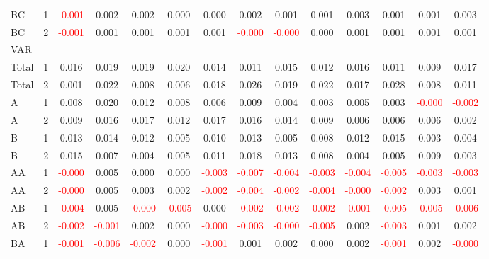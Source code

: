 \begin{table}[!htb]
{\begin{tabular}{llcccccccccccc}
BC & 1 & \textcolor{red}{-0.001} & 0.002 & 0.002 & 0.000 & 0.000 & 0.002 & 0.001 & 0.001 & 0.003 & 0.001 & 0.001 & 0.003\\
BC & 2 & \textcolor{red}{-0.001} & 0.001 & 0.001 & 0.001 & 0.001 & \textcolor{red}{-0.000} & \textcolor{red}{-0.000} & 0.000 & 0.001 & 0.001 & 0.001 & 0.001\\
\hline
VAR &  &  &  &  &  &  &  &  &  &  &  &  & \\
\hline
Total & 1 & 0.016 & 0.019 & 0.019 & 0.020 & 0.014 & 0.011 & 0.015 & 0.012 & 0.016 & 0.011 & 0.009 & 0.017\\
Total & 2 & 0.001 & 0.022 & 0.008 & 0.006 & 0.018 & 0.026 & 0.019 & 0.022 & 0.017 & 0.028 & 0.008 & 0.011\\
A & 1 & 0.008 & 0.020 & 0.012 & 0.008 & 0.006 & 0.009 & 0.004 & 0.003 & 0.005 & 0.003 & \textcolor{red}{-0.000} & \textcolor{red}{-0.002}\\
A & 2 & 0.009 & 0.016 & 0.017 & 0.012 & 0.017 & 0.016 & 0.014 & 0.009 & 0.006 & 0.006 & 0.006 & 0.002\\
B & 1 & 0.013 & 0.014 & 0.012 & 0.005 & 0.010 & 0.013 & 0.005 & 0.008 & 0.012 & 0.015 & 0.003 & 0.004\\
B & 2 & 0.015 & 0.007 & 0.004 & 0.005 & 0.011 & 0.018 & 0.013 & 0.008 & 0.004 & 0.005 & 0.009 & 0.003\\
AA & 1 & \textcolor{red}{-0.000} & 0.005 & 0.000 & 0.000 & \textcolor{red}{-0.003} & \textcolor{red}{-0.007} & \textcolor{red}{-0.004} & \textcolor{red}{-0.003} & \textcolor{red}{-0.004} & \textcolor{red}{-0.005} & \textcolor{red}{-0.003} & \textcolor{red}{-0.003}\\
AA & 2 & \textcolor{red}{-0.000} & 0.005 & 0.003 & 0.002 & \textcolor{red}{-0.002} & \textcolor{red}{-0.004} & \textcolor{red}{-0.002} & \textcolor{red}{-0.004} & \textcolor{red}{-0.000} & \textcolor{red}{-0.002} & 0.003 & 0.001\\
AB & 1 & \textcolor{red}{-0.004} & 0.005 & \textcolor{red}{-0.000} & \textcolor{red}{-0.005} & 0.000 & \textcolor{red}{-0.002} & \textcolor{red}{-0.002} & \textcolor{red}{-0.002} & \textcolor{red}{-0.001} & \textcolor{red}{-0.005} & \textcolor{red}{-0.005} & \textcolor{red}{-0.006}\\
AB & 2 & \textcolor{red}{-0.002} & \textcolor{red}{-0.001} & 0.002 & 0.000 & \textcolor{red}{-0.000} & \textcolor{red}{-0.003} & \textcolor{red}{-0.000} & \textcolor{red}{-0.005} & 0.002 & \textcolor{red}{-0.003} & 0.001 & 0.002\\
BA & 1 & \textcolor{red}{-0.001} & \textcolor{red}{-0.006} & \textcolor{red}{-0.002} & 0.000 & \textcolor{red}{-0.001} & 0.001 & 0.002 & 0.000 & 0.002 & \textcolor{red}{-0.001} & 0.002 & \textcolor{red}{-0.000}\\

\end{tabular}}
\end{table}
